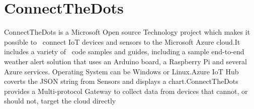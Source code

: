 \section{ConnectTheDots}
ConnectTheDots is a Microsoft Open source Technology project which makes it possible to~\cite{Azure-IoT} connect IoT devices and sensors to the Microsoft Azure cloud.It includes a variety of~\cite{connectthedots} code samples and guides, including a sample end-to-end weather alert solution that uses an Arduino board, a Raspberry Pi and several Azure services. Operating System can be Windows or Linux.Azure IoT Hub coverts the JSON string from Sensors and displays a chart.ConnectTheDots~\cite{connectthedots} provides a Multi-protocol Gateway to collect data from devices that cannot, or should not, target the cloud directly
